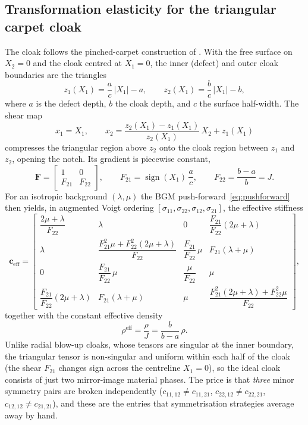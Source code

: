 \documentclass[preprint,12pt]{elsarticle}
\newcommand{\mbf}[1]{\mathbf{#1}}
\newcommand{\be}{\begin{equation}}
\newcommand{\ee}{\end{equation}}
\begin{document}
\subsection{Transformation elasticity for the triangular carpet cloak}
\label{subsec:triangular}

The cloak follows the pinched-carpet construction
of \citet{chatzopoulos2023}. With the free surface on $X_2=0$ and the
cloak centred at $X_1=0$, the inner (defect) and outer cloak boundaries
are the triangles
\be\label{eq:triangles}
  z_1(X_1) = \frac{a}{c}\,|X_1| - a,
  \qquad
  z_2(X_1) = \frac{b}{c}\,|X_1| - b,
\ee
where $a$ is the defect depth, $b$ the cloak depth, and $c$ the surface
half-width. The shear map
\be\label{eq:shearmap}
  x_1 = X_1,
  \qquad
  x_2 = \frac{z_2(X_1)-z_1(X_1)}{z_2(X_1)}\,X_2 + z_1(X_1)
\ee
compresses the triangular region above $z_2$ onto the cloak region
between $z_1$ and $z_2$, opening the notch. Its gradient is piecewise
constant,
\be\label{eq:Ftensor}
  \mbf{F} =
  \begin{bmatrix} 1 & 0 \\ F_{21} & F_{22} \end{bmatrix},
  \qquad
  F_{21} = \operatorname{sign}(X_1)\,\frac{a}{c},
  \qquad
  F_{22} = \frac{b-a}{b} = J.
\ee
For an isotropic background $(\lambda,\mu)$ the BGM
push-forward~\eqref{eq:pushforward} then yields, in augmented Voigt
ordering $[\sigma_{11},\sigma_{22},\sigma_{12},\sigma_{21}]$, the
effective stiffness
\be\label{eq:Ceff}
  \mbf{c}_{\mathrm{eff}}
  =
  \begin{bmatrix}
    \dfrac{2\mu{+}\lambda}{F_{22}} & \lambda & 0 &
      \dfrac{F_{21}}{F_{22}}(2\mu{+}\lambda) \\[2mm]
    \lambda & \dfrac{F_{21}^2\mu + F_{22}^2(2\mu{+}\lambda)}{F_{22}} &
      \dfrac{F_{21}}{F_{22}}\,\mu & F_{21}(\lambda{+}\mu) \\[2mm]
    0 & \dfrac{F_{21}}{F_{22}}\,\mu & \dfrac{\mu}{F_{22}} & \mu \\[2mm]
    \dfrac{F_{21}}{F_{22}}(2\mu{+}\lambda) & F_{21}(\lambda{+}\mu) &
      \mu & \dfrac{F_{21}^2(2\mu{+}\lambda) + F_{22}^2\mu}{F_{22}}
  \end{bmatrix},
\ee
together with the constant effective density
\be\label{eq:rhoeff}
  \rho^{\mathrm{eff}} = \frac{\rho}{J} = \frac{b}{b-a}\,\rho.
\ee
Unlike radial blow-up cloaks, whose tensors are singular at the inner
boundary, the triangular tensor is non-singular and uniform within each
half of the cloak (the shear $F_{21}$ changes sign across the
centreline $X_1=0$), so the ideal cloak consists of just two
mirror-image material phases. The price is that \emph{three} minor
symmetry pairs are broken independently
($c_{11,12}\neq c_{11,21}$, $c_{22,12}\neq c_{22,21}$,
$c_{12,12}\neq c_{21,21}$), and these are the entries that
symmetrisation strategies average away by hand.
\end{document}
